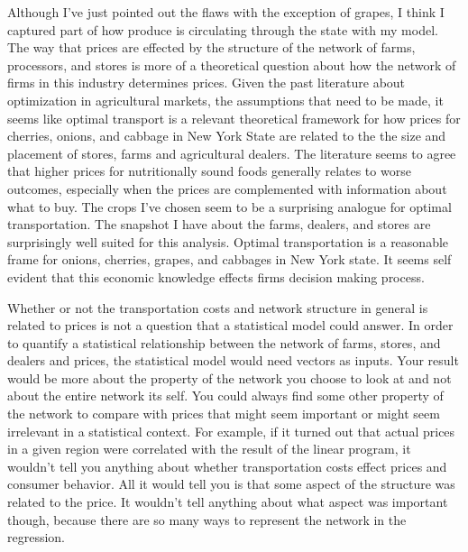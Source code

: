 \documentclass{report}
\begin{document}
Although I've just pointed out the flaws with the exception of grapes, I think I captured part of how produce is circulating through the state with my model. The way that prices are effected by the structure of the network of farms, processors, and stores is more of a theoretical question about how the network of firms in this industry determines prices. Given the past literature about optimization in agricultural markets, the assumptions that need to be made, it seems like optimal transport is a relevant theoretical framework for how prices for cherries, onions, and cabbage in New York State are related to the the size and placement of stores, farms and agricultural dealers. The literature seems to agree that higher prices for nutritionally sound foods generally relates to worse outcomes, especially when the prices are complemented with information about what to buy. The crops I've chosen seem to be a surprising analogue for optimal transportation. The snapshot I have about the farms, dealers, and stores are surprisingly well suited for this analysis.  Optimal transportation is a reasonable frame for onions, cherries, grapes, and cabbages in New York state. It seems self evident that this economic knowledge effects firms decision making process. 

Whether or not the transportation costs and network structure in general is related to prices is not a question that a statistical model could answer. In order to quantify a statistical relationship between the network of farms, stores, and dealers and prices, the statistical model would need vectors as inputs. Your result would be more about the property of the network you choose to look at and not about the entire network its self. You could always find some other property of the network to compare with prices that might seem important or might seem irrelevant in a statistical context. For example, if it turned out that actual prices in a given region were correlated with the result of the linear program, it wouldn't tell you anything about whether transportation costs effect prices and consumer behavior. All it would tell you is that some aspect of the structure was related to the price. It wouldn't tell anything about what aspect was important though, because there are so many ways to represent the network in the regression.
\end{document}
